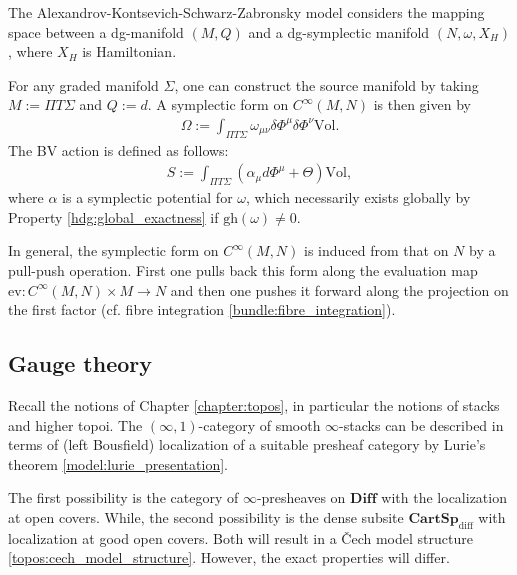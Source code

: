     \begin{example}
        The Alexandrov-Kontsevich-Schwarz-Zabronsky model considers the mapping space between a dg-manifold $(M,Q)$ and a dg-symplectic manifold $(N,\omega,X_H)$, where $X_H$ is Hamiltonian.

        For any graded manifold $\Sigma$, one can construct the source manifold by taking $M:=\Pi T\Sigma$ and $Q:=d$. A symplectic form on $C^\infty(M,N)$ is then given by
        \begin{gather}
            \Omega := \int_{\Pi T\Sigma}\omega_{\mu\nu}\delta\Phi^\mu\delta\Phi^\nu\mathrm{Vol}.
        \end{gather}
        The BV action is defined as follows:
        \begin{gather}
            S := \int_{\Pi T\Sigma}\left(\alpha_\mu d\Phi^\mu+\Theta\right)\mathrm{Vol},
        \end{gather}
        where $\alpha$ is a symplectic potential for $\omega$, which necessarily exists globally by Property \ref{hdg:global_exactness} if $\mathrm{gh}(\omega)\neq0$.

        In general, the symplectic form on $C^\infty(M,N)$ is induced from that on $N$ by a pull-push operation. First one pulls back this form along the evaluation map $\mathrm{ev}:C^\infty(M,N)\times M\rightarrow N$ and then one pushes it forward along the projection on the first factor (cf. fibre integration \ref{bundle:fibre_integration}).
    \end{example}

\subsection{Gauge theory}

    Recall the notions of Chapter \ref{chapter:topos}, in particular the notions of stacks and higher topoi. The $(\infty,1)$-category of smooth $\infty$-stacks can be described in terms of (left Bousfield) localization of a suitable presheaf category by Lurie's theorem \ref{model:lurie_presentation}.

    The first possibility is the category of $\infty$-presheaves on $\mathbf{Diff}$ with the localization at open covers. While, the second possibility is the dense subsite $\mathbf{CartSp}_\mathrm{diff}$ with localization at good open covers. Both will result in a \v{C}ech model structure \ref{topos:cech_model_structure}. However, the exact properties will differ.

